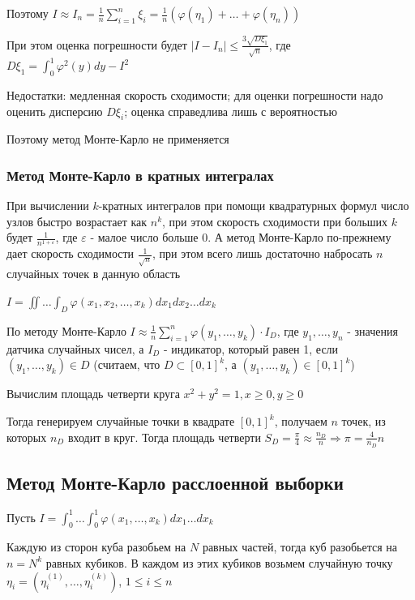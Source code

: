 \documentclass[12pt]{article}
\begin{document}
\begin{enumerate}[label*=\Roman*. ]
    Поэтому $I \approx I_n = \frac{1}{n} \sum_{i = 1}^n \xi_i = \frac{1}{n} (\varphi(\eta_1) + \dots + \varphi(\eta_n))$

    При этом оценка погрешности будет $|I - I_n| \leq \frac{3\sqrt{D \xi_1}}{\sqrt{n}}$, где $D \xi_1 = \int_0^1 \varphi^2(y) dy - I^2$

    Недостатки: медленная скорость сходимости; для оценки погрешности надо оценить дисперсию $D\xi_i$; оценка справедлива лишь с вероятностью

    Поэтому метод Монте-Карло не применяется

\end{enumerate}

\subsubsection{Метод Монте-Карло в кратных интегралах}

\Nota При вычислении $k$-кратных интегралов при помощи квадратурных формул число узлов быстро возрастает как $n^k$, при этом скорость сходимости при больших $k$ будет $\frac{1}{n^{1 + \varepsilon}}$, где $\varepsilon$ - малое число больше 0. А метод Монте-Карло по-прежнему дает скорость сходимости $\frac{1}{\sqrt{n}}$, при этом всего лишь достаточно набросать $n$ случайных точек в данную область

$I = \iint \dots \int_D \varphi(x_1, x_2, \dots, x_k) dx_1 dx_2 \dots dx_k$

По методу Монте-Карло $I \approx \frac{1}{n} \sum_{i = 1}^n \varphi(y_1, \dots, y_k) \cdot I_D$, где $y_1, \dots, y_n$ - значения датчика случайных чисел, а $I_D$ - индикатор, который равен 1, если $(y_1, \dots, y_k) \in D$ (считаем, что $D \subset [0, 1]^k$, а $(y_1, \dots, y_k) \in [0, 1]^k$) 

\Ex Вычислим площадь четверти круга $x^2 + y^2 = 1, x \geq 0, y \geq 0$

Тогда генерируем случайные точки в квадрате $[0, 1]^k$, получаем $n$ точек, из которых $n_D$ входит в круг. Тогда площадь четверти $S_D = \frac{\pi}{4} \approx \frac{n_D}{n} \Longrightarrow \pi = \frac{4}{n_D}{n}$

\subsection{Метод Монте-Карло расслоенной выборки}

Пусть $I = \int_0^1 \dots \int_0^1 \varphi(x_1, \dots, x_k) dx_1 \dots dx_k$

Каждую из сторон куба разобьем на $N$ равных частей, тогда куб разобьется на $n = N^k$ равных кубиков. В каждом из этих кубиков возьмем случайную точку $\eta_i = (\eta_i^{(1)}, \dots, \eta_i^{(k)})$, $1 \leq i \leq n$
\end{document}
